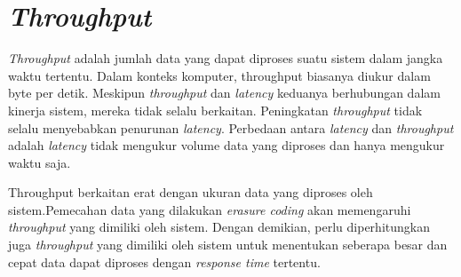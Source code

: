 \section{\textit{Throughput}}

\textit{Throughput} adalah jumlah data yang dapat diproses suatu sistem dalam jangka waktu tertentu. Dalam konteks komputer, throughput biasanya diukur dalam byte per detik. Meskipun \textit{throughput} dan \textit{latency} keduanya berhubungan dalam kinerja sistem, mereka tidak selalu berkaitan. Peningkatan \textit{throughput} tidak selalu menyebabkan penurunan \textit{latency}. Perbedaan antara \textit{latency} dan \textit{throughput} adalah \textit{latency} tidak mengukur volume data yang diproses dan hanya mengukur waktu saja.

Throughput berkaitan erat dengan ukuran data yang diproses oleh sistem.Pemecahan data yang dilakukan \textit{erasure coding} akan memengaruhi \textit{throughput} yang dimiliki oleh sistem. Dengan demikian, perlu diperhitungkan juga \textit{throughput} yang dimiliki oleh sistem untuk menentukan seberapa besar dan cepat data dapat diproses dengan \textit{response time} tertentu.